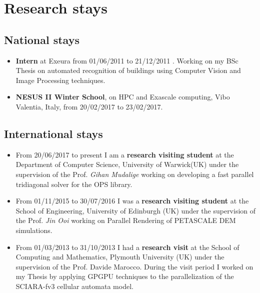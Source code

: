 \documentclass[a4paper,10pt]{article}
\begin{document}
\begin{center}
\mbox{}
\end{center}

\section{Research stays}
\subsection{National stays}

\begin{itemize}
\item \textbf{Intern} at  Exeura from 01/06/2011 to 21/12/2011 .
Working on my BSc Thesis on automated recognition of buildings using Computer Vision and Image Processing techniques.

\item \textbf{NESUS II Winter School}, on HPC and Exascale computing, Vibo Valentia, Italy, from 20/02/2017 to 23/02/2017.  
\end{itemize}


\subsection{International stays}


\begin{itemize}
 \item From 20/06/2017 to present I am a \textbf{research visiting student} at the
Department of Computer Science, University of Warwick(UK) under the
supervision of the Prof. \textit{Gihan Mudalige} working on 
developing a fast parallel tridiagonal solver for the OPS library.

 \item From 01/11/2015 to 30/07/2016 I was a  \textbf{research visiting student} at the
School of Engineering, University of Edinburgh (UK) under the
supervision of the Prof. \textit{Jin Ooi} working on Parallel Rendering of PETASCALE DEM
simulations.

\item From 01/03/2013 to 31/10/2013 I had a \textbf{research visit} at the
School of Computing and Mathematics, Plymouth University (UK) under the
supervision of the Prof. Davide Marocco.
During the visit period I worked on my  Thesis by applying GPGPU techniques to
the parallelization of the SCIARA-fv3 cellular automata model.
\end{itemize}
\end{document}

